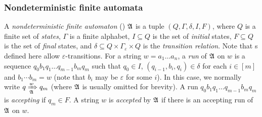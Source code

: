 \subsubsection{Nondeterministic finite automata}



A \emph{nondeterministic finite automaton} (\NFA) ${\mathfrak{A} }$ is a tuple $(Q, \Gamma, \delta, I, F)$, where $Q$ is a finite set of \emph{states}, $\Gamma$ is a finite alphabet, $I \subseteq Q$ is the set of \emph{initial} states, $F \subseteq Q$ is the set of \emph{final} states, and $\delta \subseteq Q \times \Gamma_\varepsilon \times Q$ is the \emph{transition relation}. Note that {\NFA}s defined here allow $\varepsilon$-transitions.
%
For a string $w = a_1 \dots a_n$, a \emph{run} of ${\mathfrak{A} }$ on $w$ is a sequence $q_0 b_1q_1 \dots q_{m-1} b_m q_m$ such that $q_0 \in I$,  $(q_{i-1}, b_i, q_i) \in \delta$ for each $i \in [m]$ and $b_1 \cdots b_m = w$ (note that $b_i$ may be $\varepsilon$ for some $i$). In this case, we normally write $q \xRightarrow[{\mathfrak{A} }]{w} q_m$ 
(where ${\mathfrak{A} }$ is usually omitted %
for brevity).
%
A run $q_0 b_1q_1 \dots q_{m-1} b_m q_m$ is \emph{accepting} if $q_m \in F$. A string $w$ is \emph{accepted} by ${\mathfrak{A} }$ if there is an accepting run of ${\mathfrak{A} }$ on $w$. 


